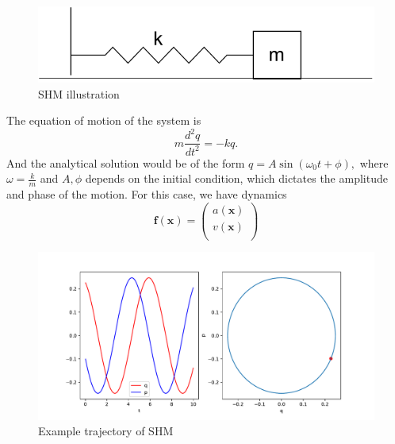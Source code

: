 \documentclass{statsmsc}
\begin{document}
\begin{figure}[H]
        \centering
        \includegraphics[width=0.8\linewidth]{../figures/shm.pdf}
        \caption{SHM illustration}
        \label{fig:shm_diagram}
\end{figure}

The equation of motion of the system is $$m\frac{d^2q}{dt^2}=-kq.$$
And the analytical solution would be of the form $q=A\sin(\omega_0t+\phi),$ where $\omega=\frac{k}{m}$ and $A, \phi$ depends on the initial condition, which dictates the amplitude and phase of the motion. 
For this case, we have dynamics 
$$
\mathbf{f}(\mathbf{x})=\begin{pmatrix}
    a(\mathbf{x})\\
    v(\mathbf{x})\\
\end{pmatrix}
$$

\begin{figure}[H] 
  \includegraphics[width=0.7\linewidth]{../codes/figures/shm_trajectory_1D.pdf}
  \centering
  \caption{Example trajectory of SHM}
  \label{fig:shm_trajectory}
\end{figure}
\end{document}
